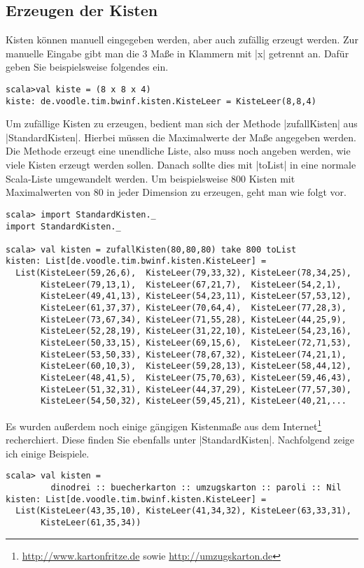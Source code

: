 \subsection{Erzeugen der Kisten}
Kisten können manuell eingegeben werden, aber auch zufällig erzeugt werden.
Zur manuelle Eingabe gibt man die 3 Maße in Klammern mit |x| getrennt an.
Dafür geben Sie beispielsweise folgendes ein.
\begin{lstlisting}
scala>val kiste = (8 x 8 x 4)
kiste: de.voodle.tim.bwinf.kisten.KisteLeer = KisteLeer(8,8,4)

\end{lstlisting}
Um zufällige Kisten zu erzeugen, bedient man sich der Methode |zufallKisten| aus |StandardKisten|.
Hierbei müssen die Maximalwerte der Maße angegeben werden.
Die Methode erzeugt eine unendliche Liste, also muss noch angeben werden, wie viele Kisten erzeugt werden sollen.
Danach sollte dies mit |toList| in eine normale Scala-Liste umgewandelt werden.
Um beispielsweise 800 Kisten mit Maximalwerten von 80 in jeder Dimension zu erzeugen, geht man wie folgt vor.
\begin{lstlisting}
scala> import StandardKisten._
import StandardKisten._

scala> val kisten = zufallKisten(80,80,80) take 800 toList
kisten: List[de.voodle.tim.bwinf.kisten.KisteLeer] =
  List(KisteLeer(59,26,6),  KisteLeer(79,33,32), KisteLeer(78,34,25),
       KisteLeer(79,13,1),  KisteLeer(67,21,7),  KisteLeer(54,2,1),
       KisteLeer(49,41,13), KisteLeer(54,23,11), KisteLeer(57,53,12),
       KisteLeer(61,37,37), KisteLeer(70,64,4),  KisteLeer(77,28,3),
       KisteLeer(73,67,34), KisteLeer(71,55,28), KisteLeer(44,25,9),
       KisteLeer(52,28,19), KisteLeer(31,22,10), KisteLeer(54,23,16),
       KisteLeer(50,33,15), KisteLeer(69,15,6),  KisteLeer(72,71,53),
       KisteLeer(53,50,33), KisteLeer(78,67,32), KisteLeer(74,21,1),
       KisteLeer(60,10,3),  KisteLeer(59,28,13), KisteLeer(58,44,12),
       KisteLeer(48,41,5),  KisteLeer(75,70,63), KisteLeer(59,46,43),
       KisteLeer(51,32,31), KisteLeer(44,37,29), KisteLeer(77,57,30),
       KisteLeer(54,50,32), KisteLeer(59,45,21), KisteLeer(40,21,...
\end{lstlisting}
Es wurden außerdem noch einige gängigen Kistenmaße aus dem Internet\footnote{\href{http://www.kartonfritze.de}{http://www.kartonfritze.de}
                                                                        sowie \href{http://umzugskarton.de}{http://umzugskarton.de}} recherchiert.
Diese finden Sie ebenfalls unter |StandardKisten|.
Nachfolgend zeige ich einige Beispiele.
\begin{lstlisting}
scala> val kisten =
         dinodrei :: buecherkarton :: umzugskarton :: paroli :: Nil
kisten: List[de.voodle.tim.bwinf.kisten.KisteLeer] =
  List(KisteLeer(43,35,10), KisteLeer(41,34,32), KisteLeer(63,33,31),
       KisteLeer(61,35,34))

\end{lstlisting}
